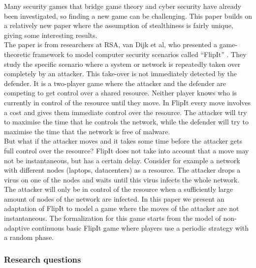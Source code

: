 Many security games that bridge game theory and cyber security have already been investigated, so finding a new game can be challenging. This paper builds on a relatively new paper where the assumption of stealthiness is fairly unique, giving some interesting results.\\ 
 The paper is from researchers at RSA, van Dijk et al,  who presented a game-theoretic framework to model computer security scenarios called ``FlipIt'' \cite{FlipIt}. They study the specific scenario where a system or network is repeatedly taken over completely by an attacker. This take-over is not immediately detected by the defender. It is a two-player game where the attacker and the defender are competing to get control over a shared resource. Neither player knows who is currently in control of the resource until they move. In FlipIt every move involves a cost and gives them immediate control over the resource. The attacker will try to maximise the time that he controls the network, while the defender will try to maximise the time that the network is free of malware. \\
 But what if the attacker moves and it takes some time before the attacker gets full control over the resource? FlipIt does not take into account that a move may not be instantaneous, but has a certain delay. Consider for example a network with different nodes (laptops, datacenters) as a resource. The attacker drops a virus on one of the nodes and waits until this virus infects the whole network. The attacker will only be in control of the resource when a sufficiently large amount of nodes of the network are infected. In this paper we present an adaptation of FlipIt to model a game where the moves of the attacker are not instantaneous. The formalization for this game starts from the model of non-adaptive continuous basic FlipIt game where players use a periodic strategy with a random phase.   \\

\subsubsection{Research questions}


